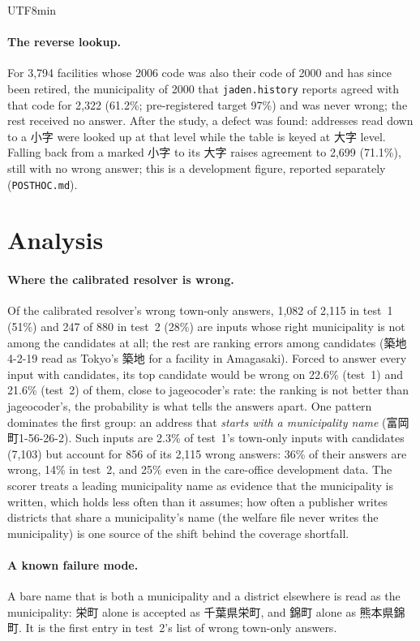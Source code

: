 \documentclass[10pt]{article}
\begin{document}
\begin{CJK}{UTF8}{min}
\paragraph{The reverse lookup.} For 3,794 facilities whose 2006 code was also their code of 2000 and has
since been retired, the municipality of 2000 that \texttt{jaden.history} reports agreed with that code for
2,322 (61.2\%; pre-registered target 97\%) and was never wrong; the rest received no answer. After the
study, a defect was found: addresses read down to a 小字 were looked up at that level while the table is
keyed at 大字 level. Falling back from a marked 小字 to its 大字 raises agreement to 2,699 (71.1\%), still
with no wrong answer; this is a development figure, reported separately (\texttt{POSTHOC.md}).

\section{Analysis}

\paragraph{Where the calibrated resolver is wrong.} Of the calibrated resolver's wrong town-only answers, 1,082 of 2,115 in test~1 (51\%) and
247 of 880 in test~2 (28\%) are inputs whose right municipality is not among the candidates at all; the
rest are ranking errors among candidates (築地4-2-19 read as Tokyo's 築地 for a facility in Amagasaki).
Forced to answer every input with candidates, its top candidate would be wrong on 22.6\% (test~1) and
21.6\% (test~2) of them, close to jageocoder's rate: the ranking is not better than jageocoder's, the
probability is what tells the answers apart. One pattern dominates the
first group: an address that \emph{starts with a municipality name} (富岡町1-56-26-2). Such inputs are 2.3\% of test~1's town-only inputs with candidates (7,103) but account for
856 of its 2,115 wrong answers: 36\% of their answers are wrong, 14\% in test~2, and 25\% even in the
care-office development data. The scorer treats a leading municipality name as evidence that the
municipality is written, which holds less often than it assumes; how often a publisher writes districts
that share a municipality's name (the welfare file never writes the municipality) is one source of the
shift behind the coverage shortfall.

\paragraph{A known failure mode.} A bare name that is both a municipality and a district elsewhere is read
as the municipality: 栄町 alone is accepted as 千葉県栄町, and 錦町 alone as 熊本県錦町. It is the first
entry in test~2's list of wrong town-only answers.


\end{CJK}
\end{document}
